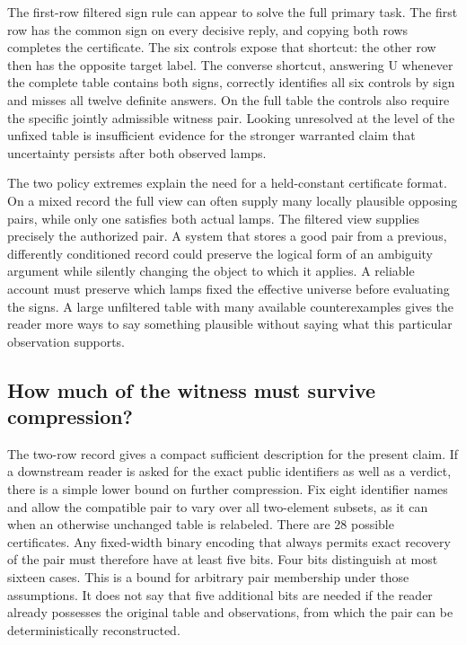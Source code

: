 \documentclass[12pt,letterpaper]{article}
\begin{document}
The first-row filtered sign rule can appear to solve the full primary task. The first row has the common sign on every decisive reply, and copying both rows completes the certificate. The six controls expose that shortcut: the other row then has the opposite target label. The converse shortcut, answering U whenever the complete table contains both signs, correctly identifies all six controls by sign and misses all twelve definite answers. On the full table the controls also require the specific jointly admissible witness pair. Looking unresolved at the level of the unfixed table is insufficient evidence for the stronger warranted claim that uncertainty persists after both observed lamps.

The two policy extremes explain the need for a held-constant certificate format. On a mixed record the full view can often supply many locally plausible opposing pairs, while only one satisfies both actual lamps. The filtered view supplies precisely the authorized pair. A system that stores a good pair from a previous, differently conditioned record could preserve the logical form of an ambiguity argument while silently changing the object to which it applies. A reliable account must preserve which lamps fixed the effective universe before evaluating the signs. A large unfiltered table with many available counterexamples gives the reader more ways to say something plausible without saying what this particular observation supports.


\subsection{How much of the witness must survive compression?}

The two-row record gives a compact sufficient description for the present claim. If a downstream reader is asked for the exact public identifiers as well as a verdict, there is a simple lower bound on further compression. Fix eight identifier names and allow the compatible pair to vary over all two-element subsets, as it can when an otherwise unchanged table is relabeled. There are 28 possible certificates. Any fixed-width binary encoding that always permits exact recovery of the pair must therefore have at least five bits. Four bits distinguish at most sixteen cases. This is a bound for arbitrary pair membership under those assumptions. It does not say that five additional bits are needed if the reader already possesses the original table and observations, from which the pair can be deterministically reconstructed.
\end{document}

